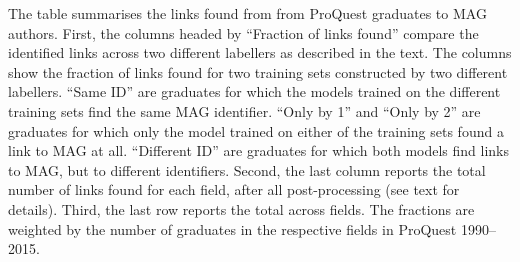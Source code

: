 \begin{table}
\begin{threeparttable}
\begin{tablenotes}[para]
\item The table summarises the links found from from ProQuest graduates to MAG authors. First, the columns headed by ``Fraction of links found'' compare the identified links across two different labellers as described in the text. The columns show the fraction of links found for two training sets constructed by two different labellers. ``Same ID'' are graduates for which the models trained on the different training sets find the same MAG identifier. ``Only by 1'' and ``Only by 2'' are graduates for which only the model trained on either of the training sets found a link to MAG at all. ``Different ID'' are graduates for which both models find links to MAG, but to different identifiers. Second, the last column reports the total number of links found for each field, after all post-processing (see text for details). Third, the last row reports the total across fields. The fractions are weighted by the number of graduates in the respective fields in ProQuest 1990--2015.
\end{tablenotes}
\end{threeparttable}
\end{table}
